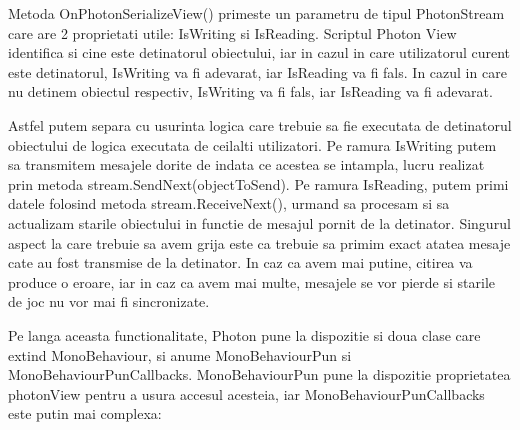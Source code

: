 \documentclass[12pt, a4paper]{article}
\begin{document}
	Metoda OnPhotonSerializeView() primeste un parametru de tipul PhotonStream care are 2 proprietati utile: IsWriting si IsReading. Scriptul Photon View identifica si cine este detinatorul obiectului, iar in cazul in care utilizatorul curent este detinatorul, IsWriting va fi adevarat, iar IsReading va fi fals. In cazul in care nu detinem obiectul respectiv, IsWriting va fi fals, iar IsReading va fi adevarat.
	\newline
	
	Astfel putem separa cu usurinta logica care trebuie sa fie executata de detinatorul obiectului de logica executata de ceilalti utilizatori. Pe ramura IsWriting putem sa transmitem mesajele dorite de indata ce acestea se intampla, lucru realizat prin metoda stream.SendNext(objectToSend). Pe ramura IsReading, putem primi datele folosind metoda stream.ReceiveNext(), urmand sa procesam si sa actualizam starile obiectului in functie de mesajul pornit de la detinator. Singurul aspect la care trebuie sa avem grija este ca trebuie sa primim exact atatea mesaje cate au fost transmise de la detinator. In caz ca avem mai putine, citirea va produce o eroare, iar in caz ca avem mai multe, mesajele se vor pierde si starile de joc nu vor mai fi sincronizate.
	\newline
	
	
	Pe langa aceasta functionalitate, Photon pune la dispozitie si doua clase care extind MonoBehaviour, si anume MonoBehaviourPun si MonoBehaviourPunCallbacks. MonoBehaviourPun pune la dispozitie proprietatea photonView pentru a usura accesul acesteia, iar MonoBehaviourPunCallbacks este putin mai complexa:
	
\end{document}
